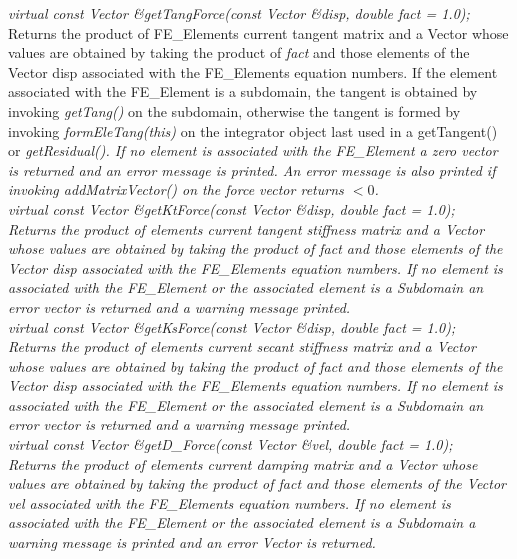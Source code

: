 {{\em virtual const Vector \&getTangForce(const Vector \&disp, double
fact = 1.0);    }\\
Returns the product of FE\_Elements current tangent matrix
and a Vector whose values are obtained by taking the product of {\em
fact} and those elements of the Vector \p disp associated with 
the FE\_Elements equation numbers. If the element associated with the
FE\_Element is a subdomain, the tangent is obtained by invoking {\em
getTang()} on the subdomain, otherwise the tangent is formed by
invoking {\em formEleTang(this)} on the integrator object last used in
a getTangent()} or {\em getResidual().
If no element is associated with the
FE\_Element a zero vector is returned and an error message is
printed. An error message is also printed if invoking
addMatrixVector() on the force vector returns $< 0$. \\

{\em virtual const Vector \&getKtForce(const Vector \&disp, double
fact = 1.0);    }\\
Returns the product of elements current tangent stiffness matrix
and a Vector whose values are obtained by taking the product of {\em
fact} and those elements of the Vector \p disp associated with 
the FE\_Elements equation numbers. If no element is associated with the
FE\_Element or the associated element is a Subdomain an error vector
is returned and a warning message printed. \\

{\em virtual const Vector \&getKsForce(const Vector \&disp, double
fact = 1.0);    }\\
Returns the product of elements current secant stiffness matrix
and a Vector whose values are obtained by taking the product of {\em
fact} and those elements of the Vector \p disp associated with 
the FE\_Elements equation numbers. If no element is associated with the
FE\_Element or the associated element is a Subdomain an error vector
is returned and a warning message printed. \\


{\em virtual const Vector \&getD\_Force(const Vector \&vel, double
fact = 1.0); }\\
Returns the product of elements current damping matrix
and a Vector whose values are obtained by taking the product of {\em
fact} and those elements of the Vector \p vel associated with 
the FE\_Elements equation numbers. If no element is associated with the
FE\_Element or the associated element is a Subdomain a warning message
is printed and an error Vector is returned. \\

}
